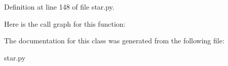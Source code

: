 Definition at line 148 of file star.\+py.

Here is the call graph for this function\+:


The documentation for this class was generated from the following file\+:\begin{DoxyCompactItemize}
\item 
star.\+py\end{DoxyCompactItemize}
